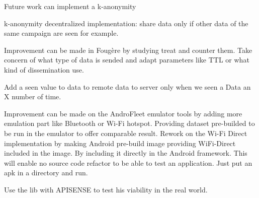 Future work can implement a k-anonymity 

k-anonymity decentralized implementation: share data only if other data of the same campaign are seen for example.



Improvement can be made in Foug\`ere by studying treat and counter them.
Take concern of what type of data is sended and adapt parameters like TTL or what kind of dissemination use.

Add a seen value to data to remote data to server only when we seen a Data an X number of time.

Improvement can be made on the AndroFleet emulator tools by adding more emulation part like Bluetooth or Wi-Fi hotspot.
Providing dataset pre-builded to be run in the emulator to offer comparable result.
Rework on the Wi-Fi Direct implementation by making Android pre-build image providing WiFi-Direct included in the image. By including it directly in the Android framework.
This will enable no source code refactor to be able to test an application.
Just put an apk in a directory and run. 


Use the lib with APISENSE to test his viability in the real world.